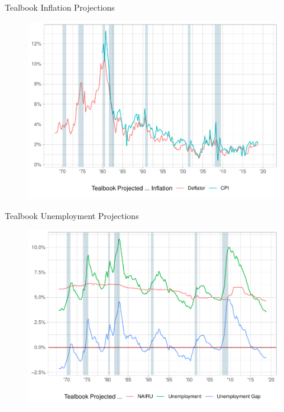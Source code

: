 \documentclass[10pt,aspectratio=169]{beamer}
\begin{document}
    \begin{frame}{Tealbook Inflation Projections}
        \begin{figure}[!h]\centering
            \begin{minipage}{0.7\textwidth}\centering
                \includegraphics[width=\textwidth]{expected_inflation_plot.pdf}
            \end{minipage}
        \end{figure}
    \end{frame}

    \begin{frame}{Tealbook Unemployment Projections}
        \begin{figure}[!h]\centering
            \begin{minipage}{0.7\textwidth}\centering
                \includegraphics[width=\textwidth]{expected_unemployment_plot.pdf}
            \end{minipage}
        \end{figure}
    \end{frame}
\end{document}
